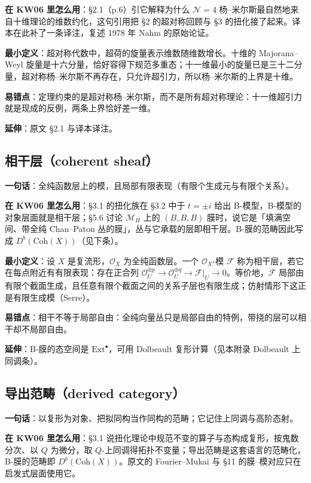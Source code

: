 \textbf{在 KW06 里怎么用}：§2.1（p.6）引它解释为什么 $\mathcal N=4$ 杨--米尔斯最自然地来自十维理论的维数约化，这句引用把 §2 的超对称回顾与 §3 的扭化接了起来。译本在此补了一条译注，复述 1978 年 Nahm 的原始论证。

\textbf{最小定义}：超对称代数中，超荷的旋量表示维数随维数增长。十维的 Majorana--Weyl 旋量是十六分量，恰好容得下规范多重态；十一维最小的旋量已是三十二分量，超对称杨--米尔斯不再存在，只允许超引力，所以杨--米尔斯的上界是十维。

\textbf{易错点}：定理约束的是超对称杨--米尔斯，而不是所有超对称理论：十一维超引力就是现成的反例，两条上界恰好差一维。

\textbf{延伸}：原文 §2.1 与译本译注。

\subsection{相干层（coherent sheaf）}

\textbf{一句话}：全纯函数层上的模，且局部有限表现（有限个生成元与有限个关系）。

\textbf{在 KW06 里怎么用}：§3.1 的扭化族在 §3.2 中于 $t=\pm i$ 给出 B-模型，B-模型的对象层面就是相干层；§5.6 讨论 $\mathcal M_H$ 上的 $(B,B,B)$ 膜时，说它是「填满空间、带全纯 Chan--Paton 丛的膜」，丛与它承载的层即相干层。B-膜的范畴因此写成 $D^b(\mathrm{Coh}(X))$（见下条）。

\textbf{最小定义}：设 $X$ 是复流形，$\mathcal O_X$ 为全纯函数层。一个 $\mathcal O_X$-模 $\mathcal F$ 称为相干层，若它在每点附近有有限表现：存在正合列 $\mathcal O_U^{\oplus p}\to\mathcal O_U^{\oplus q}\to\mathcal F|_U\to0$。等价地，$\mathcal F$ 局部由有限个截面生成，且任意有限个截面之间的关系子层也有限生成；仿射情形下这正是有限生成模（Serre）。

\textbf{易错点}：相干不等于局部自由：全纯向量丛只是局部自由的特例，带挠的层可以相干却不局部自由。

\textbf{延伸}：B-膜的态空间是 $\mathrm{Ext}^\bullet$，可用 Dolbeault 复形计算（见本附录 Dolbeault 上同调条）。

\subsection{导出范畴（derived category）}

\textbf{一句话}：以复形为对象、把拟同构当作同构的范畴；它记住上同调与高阶态射。

\textbf{在 KW06 里怎么用}：§3.1 说扭化理论中规范不变的算子与态构成复形，按鬼数分次、以 $Q$ 为微分，取 $Q$-上同调得拓扑不变量；导出范畴是这套语言的范畴化，B-膜的范畴即 $D^b(\mathrm{Coh}(X))$。原文的 Fourier--Mukai 与 §11 的膜--模对应只在启发式层面使用它。

